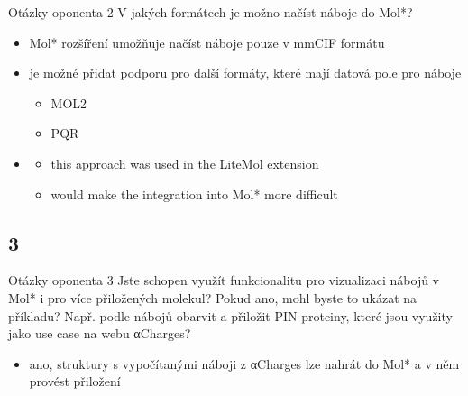 \documentclass[
]{beamer}
\begin{document}
\begin{frame}
  \begin{block}{Otázky oponenta 2}
    V jakých formátech je možno načíst náboje do Mol*?
  \end{block}
  \begin{itemize}
    \item Mol* rozšíření umožňuje načíst náboje pouze v mmCIF formátu
    \item je možné přidat podporu pro další formáty, které mají datová pole pro náboje
    \begin{itemize}
      \item MOL2
      \item PQR
    \end{itemize}
    \item 
    \begin{itemize}
      \item this approach was used in the LiteMol extension
      \item would make the integration into Mol* more difficult
    \end{itemize}
  \end{itemize}
\end{frame}

\subsection[3]{3}

\begin{frame}
  \begin{block}{Otázky oponenta 3}
    Jste schopen využít funkcionalitu pro vizualizaci nábojů v Mol* i pro více přiložených molekul? Pokud ano, mohl byste to ukázat na příkladu? Např. podle nábojů obarvit a přiložit PIN proteiny, které jsou využity jako use case na webu αCharges?
  \end{block}
  \begin{itemize}
    \item ano, struktury s vypočítanými náboji z αCharges lze nahrát do Mol* a v něm provést přiložení
  \end{itemize}
\end{frame}
\end{document}
